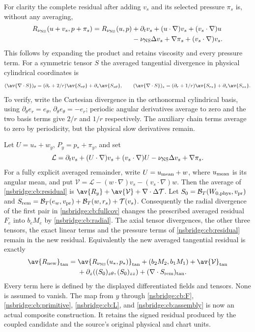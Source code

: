For clarity the complete residual after adding $v_s$ and its selected
pressure $\pi_s$ is, without any averaging,
\begin{align}
 R_{\nu_{\rm NS}}(u+v_s,p+\pi_s)
 =R_{\nu_{\rm NS}}(u,p)
 &+\partial_tv_s+(u\cdot\nabla)v_s+(v_s\cdot\nabla)u \nonumber\\
 &-\nu_{\rm NS}\Delta v_s+\nabla\pi_s
 +(v_s\cdot\nabla)v_s . \label{nsbridge:cb:residual}
\end{align}
This follows by expanding the product and retains viscosity and every
pressure term. For a symmetric tensor $S$ the averaged tangential
divergence in physical cylindrical coordinates is
\[
 (\av{\nabla\cdot S})_\theta
   =(\partial_r+2/r)\av{S_{r\theta}}+\partial_z\av{S_{z\theta}},
 \qquad
 (\av{\nabla\cdot S})_z
   =(\partial_r+1/r)\av{S_{rz}}+\partial_z\av{S_{zz}} .
\]
To verify, write the Cartesian divergence in the orthonormal cylindrical
basis, using $\partial_\theta e_r=e_\theta$,
$\partial_\theta e_\theta=-e_r$; periodic angular derivatives average
to zero and the two basis terms give $2/r$ and $1/r$ respectively.
The auxiliary chain terms average to zero by periodicity, but the
physical slow derivatives remain.

Let $U=u_*+w_y$, $P_y=p_*+\pi_y$, and set
\[
 \mathcal L=
 \partial_tv_s+(U\cdot\nabla)v_s+(v_s\cdot\nabla)U
 -\nu_{\rm NS}\Delta v_s+\nabla\pi_s .
\]
For a fully explicit averaged remainder, write $U=u_{\rm mean}+w$,
where $u_{\rm mean}$ is its angular mean, and put
$\mathcal V=\mathcal L-(w\cdot\nabla)v_s-(v_s\cdot\nabla)w$.
Then the average of \eqref{nsbridge:cb:residual} is
$\av{R_y}+\av{\mathcal V}+\nabla\cdot\Delta\mathcal T$.
Let $S_0=\mathcal B_T(W_{0,\rm phys},v_{\rm pr})$ and
$S_{\rm rem}=\mathcal B_T(e_w,v_{\rm pr})
 +\mathcal B_T(w,r_s)+\mathcal T(v_s)$.
Consequently the radial divergence of the first pair in
\eqref{nsbridge:cb:fullcov} changes the prescribed averaged residual $F_e$ into
$b_eM_e$ by \eqref{nsbridge:cb:radial}. The axial tensor divergences, the other
three tensors, the exact linear terms and the pressure terms of
\eqref{nsbridge:cb:residual} remain in the new residual. Equivalently the new
averaged tangential residual is exactly
\begin{align*}
 \av{R_{\rm new}}_{\rm tan}
 ={}&\av{R_{\nu_{\rm NS}}(u_*,p_*)}_{\rm tan}
 +(b_2M_2,b_1M_1)+\av{\mathcal V}_{\rm tan}\\
 &+\partial_z((S_0)_{z\theta},(S_0)_{zz})
   +(\nabla\cdot S_{\rm rem})_{\rm tan}.
\end{align*}
Every term here is defined by the displayed differentiated fields and
tensors. None is assumed to vanish.
The map from $y$ through \eqref{nsbridge:cb:F}, \eqref{nsbridge:cb:primitive},
\eqref{nsbridge:cb:L}, and \eqref{nsbridge:cb:assembly} is now an actual composite
construction. It retains the signed residual produced by the coupled
candidate and the source's original physical and chart units.

